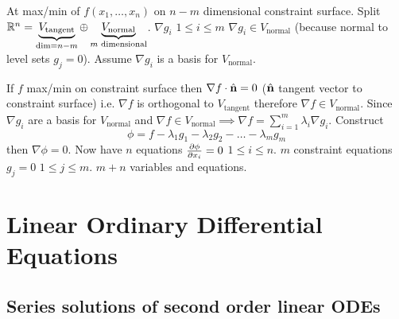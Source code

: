 \documentclass[10pt, a4paper]{article}
\begin{document}
At max/min of $f(x_1, \dotsc, x_n)$ on $n-m$ dimensional constraint surface.
Split $\R ^ n = \underbrace{V_{\text{tangent}}}_{\dim = n - m} \oplus \underbrace{V_{\text{normal}}}_{m \text{ dimensional}}$.
$\nabla g_i$
$1 \leq i \leq m$
$\nabla g_i \in V_{\text{normal}}$
(because normal to level sets $g_j = 0$).
Assume $\nabla g_i$ is a basis for $V_{\text{normal}}$.

If $f$ max/min on constraint surface then $\nabla f \cdot \hat{\mbf{n}} = 0$
($\hat{\mbf{n}}$ tangent vector to constraint surface)
i.e. $\nabla f$ is orthogonal to $V_{\text{tangent}}$ therefore $\nabla f \in V_{\text{normal}}$.
Since $\nabla g_i$ are a basis for $V_{\text{normal}}$ and $\nabla f \in V_{\text{normal}} \implies \nabla f = \sum_{i = 1}^{m}\lambda_i\nabla g_i$.
Construct
\[
\phi = f - \lambda_1 g_1 - \lambda_2g_2 - \dotsc - \lambda_mg_m
\]
then $\nabla \phi = 0$.
Now have $n$ equations $\pd[\phi]{x_i} = 0$ $1 \leq i \leq n$.
$m$ constraint equations $g_j = 0$ $1 \leq j \leq m$.
$m + n$ variables and equations.

\newpage

\section{Linear Ordinary Differential Equations}

\subsection{Series solutions of second order linear ODEs}
\end{document}
